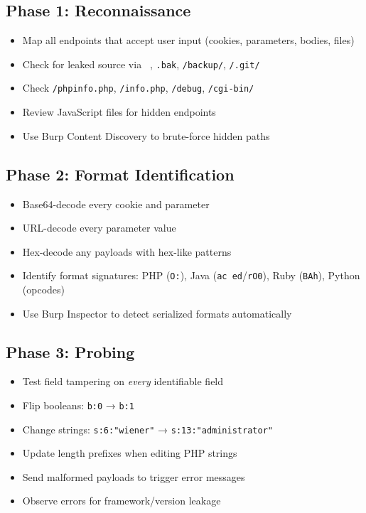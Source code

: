 \documentclass[11pt]{article}
\begin{document}
\begin{checklistbox}
\subsection*{Phase 1: Reconnaissance}
\begin{itemize}
    \item[$\square$] Map all endpoints that accept user input (cookies, parameters, bodies, files)
    \item[$\square$] Check for leaked source via \texttt{~}, \texttt{.bak}, \texttt{/backup/}, \texttt{/.git/}
    \item[$\square$] Check \texttt{/phpinfo.php}, \texttt{/info.php}, \texttt{/debug}, \texttt{/cgi-bin/}
    \item[$\square$] Review JavaScript files for hidden endpoints
    \item[$\square$] Use Burp Content Discovery to brute-force hidden paths
\end{itemize}

\subsection*{Phase 2: Format Identification}
\begin{itemize}
    \item[$\square$] Base64-decode every cookie and parameter
    \item[$\square$] URL-decode every parameter value
    \item[$\square$] Hex-decode any payloads with hex-like patterns
    \item[$\square$] Identify format signatures: PHP (\texttt{O:}), Java (\texttt{ac ed}/\texttt{rO0}), Ruby (\texttt{BAh}), Python (opcodes)
    \item[$\square$] Use Burp Inspector to detect serialized formats automatically
\end{itemize}

\subsection*{Phase 3: Probing}
\begin{itemize}
    \item[$\square$] Test field tampering on \textit{every} identifiable field
    \item[$\square$] Flip booleans: \texttt{b:0} → \texttt{b:1}
    \item[$\square$] Change strings: \texttt{s:6:"wiener"} → \texttt{s:13:"administrator"}
    \item[$\square$] Update length prefixes when editing PHP strings
    \item[$\square$] Send malformed payloads to trigger error messages
    \item[$\square$] Observe errors for framework/version leakage
\end{itemize}


\end{checklistbox}
\end{document}
